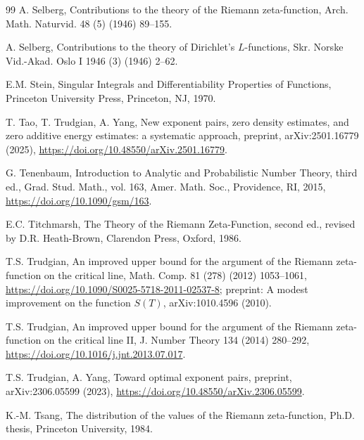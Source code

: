 \documentclass[preprint,12pt]{elsarticle}
\numberwithin{equation}{section}
\theoremstyle{plain}
\theoremstyle{definition}
\theoremstyle{remark}
\begin{document}
\begin{thebibliography}{99}
A. Selberg, Contributions to the theory of the Riemann zeta-function, Arch. Math. Naturvid. 48 (5) (1946) 89--155.

A. Selberg, Contributions to the theory of Dirichlet's $L$-functions, Skr. Norske Vid.-Akad. Oslo I 1946 (3) (1946) 2--62.

E.M. Stein, Singular Integrals and Differentiability Properties of Functions, Princeton University Press, Princeton, NJ, 1970.

T. Tao, T. Trudgian, A. Yang, New exponent pairs, zero density estimates, and zero additive energy estimates: a systematic approach, preprint, arXiv:2501.16779 (2025), \href{https://doi.org/10.48550/arXiv.2501.16779}{https://doi.org/10.48550/arXiv.2501.16779}.

G. Tenenbaum, Introduction to Analytic and Probabilistic Number Theory, third ed., Grad. Stud. Math., vol. 163, Amer. Math. Soc., Providence, RI, 2015, \href{https://doi.org/10.1090/gsm/163}{https://doi.org/10.1090/gsm/163}.

E.C. Titchmarsh, The Theory of the Riemann Zeta-Function, second ed., revised by D.R. Heath-Brown, Clarendon Press, Oxford, 1986.

T.S. Trudgian, An improved upper bound for the argument of the Riemann zeta-function on the critical line, Math. Comp. 81 (278) (2012) 1053--1061, \href{https://doi.org/10.1090/S0025-5718-2011-02537-8}{https://doi.org/10.1090/S0025-5718-2011-02537-8}; preprint: A modest improvement on the function $S(T)$, arXiv:1010.4596 (2010).

T.S. Trudgian, An improved upper bound for the argument of the Riemann zeta-function on the critical line II, J. Number Theory 134 (2014) 280--292, \href{https://doi.org/10.1016/j.jnt.2013.07.017}{https://doi.org/10.1016/j.jnt.2013.07.017}.

T.S. Trudgian, A. Yang, Toward optimal exponent pairs, preprint, arXiv:2306.05599 (2023), \href{https://doi.org/10.48550/arXiv.2306.05599}{https://doi.org/10.48550/arXiv.2306.05599}.

K.-M. Tsang, The distribution of the values of the Riemann zeta-function, Ph.D. thesis, Princeton University, 1984.

\end{thebibliography}
\end{document}
